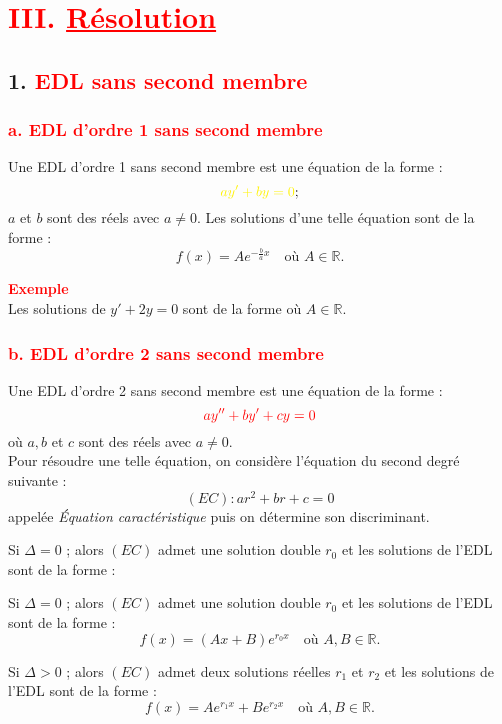 \documentclass[12pt]{article}
\begin{document}
\section*{\textcolor{red}{III. \underline{Résolution}}}
\subsection*{1. \textcolor{red}{EDL sans second membre}}

\subsubsection*{\textcolor{red}{a. EDL d’ordre 1 sans second membre}}
Une EDL d’ordre 1 sans second membre est une équation de la forme : 
\[
\textcolor{yellow}{ay' + by = 0} ;
\]
$a$ et $b$ sont des réels avec $a \neq 0$. Les solutions d’une telle équation sont de la forme : 
\[
\boxed{f(x) = Ae^{-\frac{b}{a}x}} \quad \text{où } A \in \mathbb{R}.
\]

\textbf{\textcolor{red}{Exemple}}\\
Les solutions de $y' + 2y = 0$ sont de la forme  où $A \in \mathbb{R}$.

\vspace{0.5cm}

\subsubsection*{\textcolor{red}{b. EDL d’ordre 2 sans second membre}}
Une EDL d’ordre 2 sans second membre est une équation de la forme :
\[
\textcolor{red}{ay'' + by' + cy = 0}
\]
où $a, b$ et $c$ sont des réels avec $a \neq 0$.\\
Pour résoudre une telle équation, on considère l’équation du second degré suivante : 
\[
\boxed{(EC) : ar^2 + br + c = 0}
\]
appelée \textit{Équation caractéristique} puis on détermine son discriminant.

\vspace{0.3cm}
Si $\Delta = 0$ ; alors $(EC)$ admet une solution double $r_0$ et les solutions de l’EDL sont de la forme :

\vspace{0.5cm}

Si $\Delta = 0$ ; alors $(EC)$ admet une solution double $r_0$ et les solutions de l’EDL sont de la forme :
\[
\boxed{f(x) = (Ax + B)e^{r_0 x}} \quad \text{où } A, B \in \mathbb{R}.
\]

Si $\Delta > 0$ ; alors $(EC)$ admet deux solutions réelles $r_1$ et $r_2$ et les solutions de l’EDL sont de la forme :
\[
\boxed{f(x) = Ae^{r_1 x} + Be^{r_2 x}} \quad \text{où } A, B \in \mathbb{R}.
\]
\end{document}

